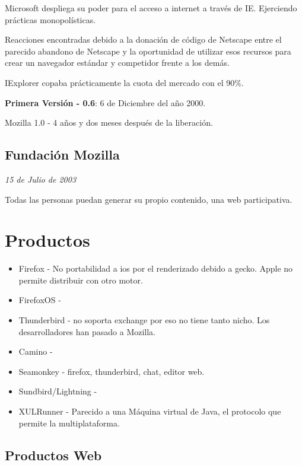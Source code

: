 \documentclass[11pt]{scrartcl}
\begin{document}
Microsoft despliega su poder para el acceso a internet a trav\'es de IE. Ejerciendo pr\'acticas monopol\'isticas.

Reacciones encontradas debido a la donaci\'on de c\'odigo de Netscape entre el parecido abandono de Netscape y la oportunidad de utilizar esos recursos para crear un navegador est\'andar y competidor frente a los dem\'as.

IExplorer copaba pr\'acticamente la cuota del mercado con el 90\%.

\textbf{Primera Versi\'on - 0.6}: 6 de Diciembre del a\~no 2000.

Mozilla 1.0 - 4 a\~nos y dos meses despu\'es de la liberaci\'on.


\subsection{Fundaci\'on Mozilla}
\label{sub:foundation}

\emph{15 de Julio de 2003}

Todas las personas puedan generar su propio contenido, una web participativa.


\section{Productos}
\label{sec:productos}

\begin{itemize}
	\item Firefox - No portabilidad a ios por el renderizado debido a gecko. Apple no permite distribuir con otro motor.
	\item FirefoxOS - 
	\item Thunderbird - no soporta exchange por eso no tiene tanto nicho. Los desarrolladores han pasado a Mozilla.
	\item Camino - 
	\item Seamonkey - firefox, thunderbird, chat, editor web.
	\item Sundbird/Lightning - 
	\item XULRunner - Parecido a una Máquina virtual de Java, el protocolo que permite la multiplataforma.
\end{itemize}

\subsection{Productos Web}
\label{sub:web-products}
\end{document}

